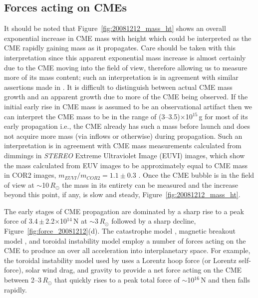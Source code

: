 
\subsection{Forces acting on CMEs}\label{sec:21}

It should be noted that Figure~\ref{fig:20081212_mass_ht} shows an overall exponential increase in CME mass with height which could be interpreted as the CME rapidly 
gaining mass as it propagates. Care should be taken with this interpretation since this apparent exponential mass increase is almost certainly due 
to the CME moving into the field of view, therefore allowing us to measure more of its mass content; such an interpretation is in agreement with 
similar assertions made in \citet{vour2010}. 
It is difficult to distinguish between actual CME mass growth and an apparent growth due to more of the CME being observed. If the initial early rise
in CME mass is assumed to be an observational artifact then we can interpret the CME mass to be in the range of (3--3.5)$\times$10$^{15}$\,g for 
most of its early
propagation i.e., the CME already has such a mass before launch and does not acquire more mass (via inflows or otherwise) during propagation.
Such an interpretation is in agreement with CME mass measurements calculated from dimmings in \emph{STEREO} Extreme Ultraviolet Image
(EUVI) images, which show the mass calculated from EUV images to be approximately equal to CME mass in COR2 images,  $m_{EUVI}/m_{COR2} =1.1\pm0.3$  \citep{aschw09}. Once the CME bubble is in the field of view at $\sim$10\,$R_{\odot}$ the mass in its entirety can be measured
and the increase beyond this point, if any, is slow and steady, Figure~\ref{fig:20081212_mass_ht}.

The early stages of CME propagation are dominated by a sharp rise to a peak force of 3.4\,$\pm$\,2.2$\times$10$^{14}$\,N at $\sim$3\,$R_
{\odot}$ followed by a sharp decline, Figure~\ref{fig:force_20081212}(d). The catastrophe model \citep{forbes1991,forbes1995,lin2000}, 
magnetic breakout model \citep{antio99,lynch2008}, and toroidal instability model \citep{chen1996,kleim2006} employ a number of forces acting 
on the CME to produce an over all acceleration into interplanetary space. For example, the toroidal instability model used by \citet{chen1996} uses 
a Lorentz hoop force (or Lorentz self-force), solar wind drag, and gravity to provide a net force acting on the CME between 2--3\,$R_{\odot}$ that quickly 
rises to a peak total force of $\sim$10$^{16}$\,N and then falls rapidly.

